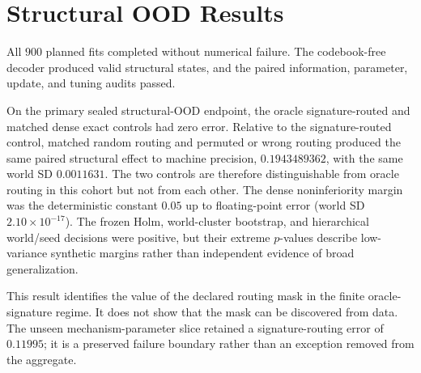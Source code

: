 \section{Structural OOD Results}
\label{sec:ood-results}

All \(900\) planned fits completed without numerical failure.  The
codebook-free decoder produced valid structural states, and the paired
information, parameter, update, and tuning audits passed.

On the primary sealed structural-OOD endpoint, the oracle
signature-routed and matched dense exact controls had zero error.  Relative to
the signature-routed control, matched random routing and permuted or wrong
routing produced the same paired structural effect to machine precision,
\(0.1943489362\), with the same world SD \(0.0011631\).  The two controls are
therefore distinguishable from oracle routing in this cohort but not from each
other.  The dense noninferiority margin was the deterministic constant \(0.05\)
up to floating-point error (world SD \(2.10\times10^{-17}\)).  The frozen Holm,
world-cluster bootstrap, and hierarchical world/seed decisions were positive,
but their extreme \(p\)-values describe low-variance synthetic margins rather
than independent evidence of broad generalization.

This result identifies the value of the declared routing mask in the finite
oracle-signature regime.  It does not show that the mask can be discovered
from data.  The unseen mechanism-parameter slice retained a signature-routing
error of \(0.11995\); it is a preserved failure boundary rather than an
exception removed from the aggregate.
